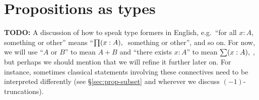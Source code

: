 {\section{Propositions as types}
\label{sec:pat}

\textbf{TODO:} A discussion of how to speak type formers in English, e.g.\ ``for all $x:A$, something or other'' means ``$\prd{x:A}$ something or other'', and so on.
For now, we will use ``$A$ or $B$'' to mean $A+B$ and ``there exists $x:A$'' to mean $\sm{x:A}$, but perhaps we should mention that we will refine it further later on.
For instance, sometimes classical statements involving these connectives need to be interpreted differently (see \S\ref{sec:prop-subset} and wherever we discuss $(-1)$-truncations).
}%


